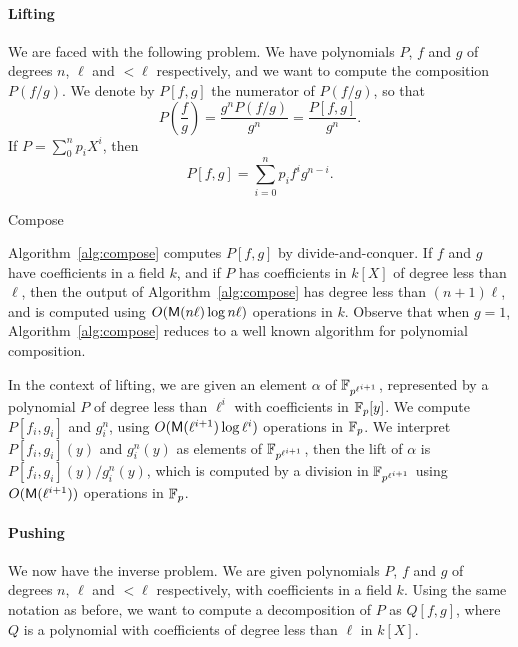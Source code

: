 \documentclass{sig-alternate}
\begin{document}
\paragraph{Lifting}
We are faced with the following problem. We have polynomials $P$, $f$
and $g$ of degrees $n$, $\ell$ and $<\ell$ respectively, and we want
to compute the composition $P(f/g)$. We denote by $P[f,g]$ the
numerator of $P(f/g)$, so that
\begin{equation}
  P\left(\frac{f}{g}\right) = \frac{g^nP(f/g)}{g^n} = \frac{P[f,g]}{g^n}.
\end{equation}
If $P=\sum_0^np_iX^i$, then
\begin{equation}
  P[f,g] = \sum_{i=0}^n  p_if^ig^{n-i}.
\end{equation}

\begin{algorithm}[t]
  \caption{Compose}
  \label{alg:compose}
  \begin{algorithmic}
    \REQUIRE
    \ENSURE
  \end{algorithmic}
\end{algorithm}

Algorithm~\ref{alg:compose} computes $P[f,g]$ by divide-and-conquer.
If $f$ and $g$ have coefficients in a field $k$, and if $P$ has
coefficients in $k[X]$ of degree less than $\ell$, then the output of
Algorithm~\ref{alg:compose} has degree less than $(n+1)\ell$, and is
computed using $O(\mathsf{M}(n\ell)\log n\ell)$ operations in $k$. Observe
that when $g=1$, Algorithm~\ref{alg:compose} reduces to a well known
algorithm for polynomial composition.

In the context of lifting, we are given an element $\alpha$ of
$\mathbb{F}_{p^{\ell^{i+1}}}$, represented by a polynomial $P$ of degree less
than $\ell^i$ with coefficients in $\mathbb{F}_p[y]$. We compute $P[f_i,g_i]$
and $g_i^n$, using $O(\mathsf{M}(\ell^{i+1})\log\ell^i)$ operations in
$\mathbb{F}_p$. We interpret $P[f_i,g_i](y)$ and $g_i^n(y)$ as elements of
$\mathbb{F}_{p^{\ell^{i+1}}}$, then the lift of $\alpha$ is
$P[f_i,g_i](y)/g_i^n(y)$, which is computed by a division in
$\mathbb{F}_{p^{\ell^{i+1}}}$ using $O(\mathsf{M}(\ell^{i+1}))$ operations in
$\mathbb{F}_p$.

\paragraph{Pushing}
We now have the inverse problem. We are given polynomials $P$, $f$ and
$g$ of degrees $n$, $\ell$ and $<\ell$ respectively, with coefficients
in a field $k$. Using the same notation as before, we want to compute
a decomposition of $P$ as $Q[f,g]$, where $Q$ is a polynomial with
coefficients of degree less than $\ell$ in $k[X]$.
\end{document}
